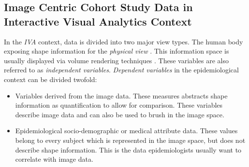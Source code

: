 \documentclass[journal]{style/vgtc} 			          %
\begin{document}
\subsection{Image Centric Cohort Study Data in Interactive Visual Analytics Context}
In the \emph{IVA} context, data is divided into two major view types.
%
The human body exposing shape information for the \emph{physical view} \cite{Oeltze2013}.
%
This information space is usually displayed via volume rendering techniques \cite{Oeltze2007}.
%
%
These variables are also referred to as \emph{independent variables}.
%
\emph{Dependent variables} in the epidemiological context can be divided twofold:
%
\begin{itemize}
	\item Variables derived from the image data. 
	These measures abstracts shape information as quantification to allow for comparison. 
	These variables describe image data and can also be used to brush in the image space.
	\item Epidemiological socio-demographic or medical attribute data.
	These values belong to every subject which is represented in the image space, but does not describe shape information.
	This is the data epidemiologists usually want to correlate with image data.
\end{itemize}
%
% 
\end{document}
